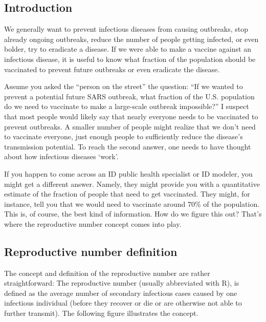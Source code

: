 \documentclass[]{article}
\theoremstyle{definition}
\theoremstyle{definition}
\theoremstyle{definition}
\theoremstyle{remark}
\begin{document}
\subsection{Introduction}\label{introduction-3}

We generally want to prevent infectious diseases from causing outbreaks,
stop already ongoing outbreaks, reduce the number of people getting
infected, or even bolder, try to eradicate a disease. If we were able to
make a vaccine against an infectious disease, it is useful to know what
fraction of the population should be vaccinated to prevent future
outbreaks or even eradicate the disease.

Assume you asked the ``person on the street'' the question: ``If we
wanted to prevent a potential future SARS outbreak, what fraction of the
U.S. population do we need to vaccinate to make a large-scale outbreak
impossible?'' I suspect that most people would likely say that nearly
everyone needs to be vaccinated to prevent outbreaks. A smaller number
of people might realize that we don't need to vaccinate everyone, just
enough people to sufficiently reduce the disease's transmission
potential. To reach the second answer, one needs to have thought about
how infectious diseases `work'.

If you happen to come across an ID public health specialist or ID
modeler, you might get a different answer. Namely, they might provide
you with a quantitative estimate of the fraction of people that need to
get vaccinated. They might, for instance, tell you that we would need to
vaccinate around 70\% of the population. This is, of course, the best
kind of information. How do we figure this out? That's where the
reproductive number concept comes into play.

\subsection{Reproductive number
definition}\label{reproductive-number-definition}

The concept and definition of the reproductive number are rather
straightforward: The reproductive number (usually abbreviated with R),
is defined as the average number of secondary infectious cases caused by
one infectious individual (before they recover or die or are otherwise
not able to further transmit). The following figure illustrates the
concept.
\end{document}
